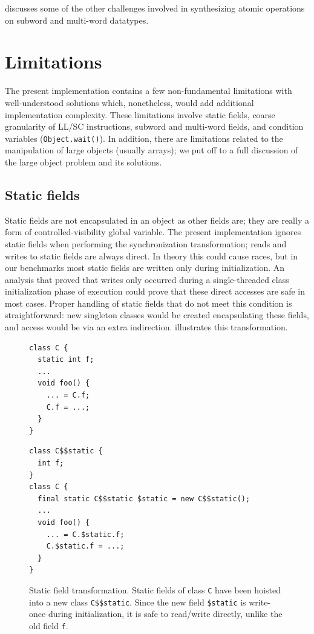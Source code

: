  discusses some of the other challenges involved in
synthesizing atomic operations on subword and multi-word datatypes.

\section{Limitations}
The present \apex implementation contains a few non-fundamental
limitations with well-understood solutions which, nonetheless, would
add additional implementation complexity.  These limitations involve static
fields, coarse granularity of LL/SC instructions, subword and
multi-word fields, and condition variables (\texttt{Object.wait()}).
In addition, there are
limitations related to the manipulation of large objects (usually
arrays); we put off to  a full discussion of the
large object problem and its solutions.

\subsection{Static fields}
Static fields are not encapsulated in an object as other fields are;
they are really a form of controlled-visibility global variable.  The
present implementation ignores static fields when performing the
synchronization transformation; reads and writes to static fields are
always direct.  In theory this could cause races, but in our
benchmarks most static fields are written only during initialization.
An analysis that proved that writes only occurred during a
single-threaded class initialization phase of execution could prove
that these direct accesses are safe in most cases.  Proper handling of
static fields that do not meet this condition is straightforward:
new singleton classes would be created encapsulating these fields, and
access would be via an extra indirection.  
illustrates this transformation.
\begin{figure}\sis\fontsize{9}{10}
\begin{minipage}[b]{1in}
\begin{verbatim}
class C {
  static int f;
  ...
  void foo() {
    ... = C.f;
    C.f = ...;
  }
}
\end{verbatim}
\end{minipage}
\raisebox{.4in}{$\quad\Rightarrow\quad$}
\begin{minipage}[b]{3in}
\begin{verbatim}
class C$$static {
  int f;
}
class C {
  final static C$$static $static = new C$$static();
  ...
  void foo() {
    ... = C.$static.f;
    C.$static.f = ...;
  }
}
\end{verbatim}
\end{minipage}%
\caption[Static field transformation.]
{Static field transformation.  Static fields of class \texttt{C} have
  been hoisted into a new class \texttt{C\$\$static}.  Since the new
  field \texttt{\$static} is write-once during initialization, it is
  safe to read/write directly, unlike the old field \texttt{f}.}
\label{fig:static-fields}
\end{figure}

